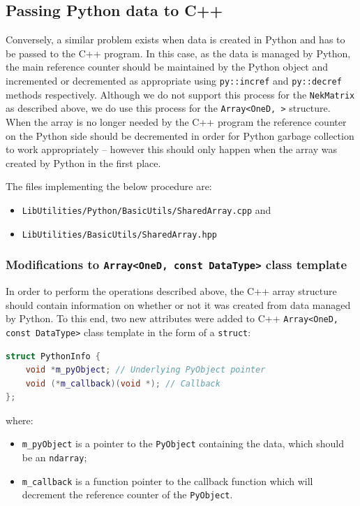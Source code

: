 \subsection{Passing Python data to C++} 

Conversely, a similar problem exists when data is created in Python and has to
be passed to the C++ program. In this case, as the data is managed by Python,
the main reference counter should be maintained by the Python object and
incremented or decremented as appropriate using \texttt{py::incref} and
\texttt{py::decref} methods respectively. Although we do not support this
process for the \texttt{NekMatrix} as described above, we do use this process
for the \texttt{Array<OneD, >} structure. When the array is no longer needed by
the C++ program the reference counter on the Python side should be decremented
in order for Python garbage collection to work appropriately -- however this
should only happen when the array was created by Python in the first place.

The files implementing the below procedure are:

\begin{itemize}
  \item \texttt{LibUtilities/Python/BasicUtils/SharedArray.cpp} and
  \item \texttt{LibUtilities/BasicUtils/SharedArray.hpp}
\end{itemize}

\subsubsection{Modifications to \texttt{Array<OneD, const DataType>} class template}

In order to perform the operations described above, the C++ array structure
should contain information on whether or not it was created from data managed by
Python. To this end, two new attributes were added to C++ \texttt{Array<OneD,
  const DataType>} class template in the form of a \texttt{struct}:

\begin{lstlisting}[language=C++]
struct PythonInfo {
    void *m_pyObject; // Underlying PyObject pointer
    void (*m_callback)(void *); // Callback
};
\end{lstlisting}

where:

\begin{itemize}
  \item \texttt{m\_pyObject} is a pointer to the \texttt{PyObject} containing
  the data, which should be an \texttt{ndarray};
  \item \texttt{m\_callback} is a function pointer to the callback function
  which will decrement the reference counter of the \texttt{PyObject}.
\end{itemize}

